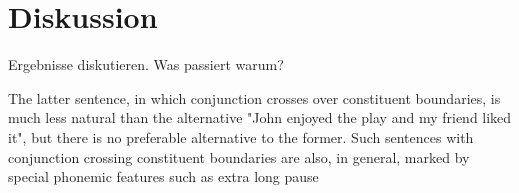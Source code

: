 \chapter{Diskussion}
\label{chap:Diskussion}
\pagestyle{plain}

Ergebnisse diskutieren. Was passiert warum?



The latter sentence, in which conjunction crosses over constituent boundaries, is much less natural than the alternative "John enjoyed the play and my friend liked it", but there is no preferable alternative to the former. Such sentences with conjunction crossing constituent boundaries are also, in general, marked by special phonemic features such as extra long pause